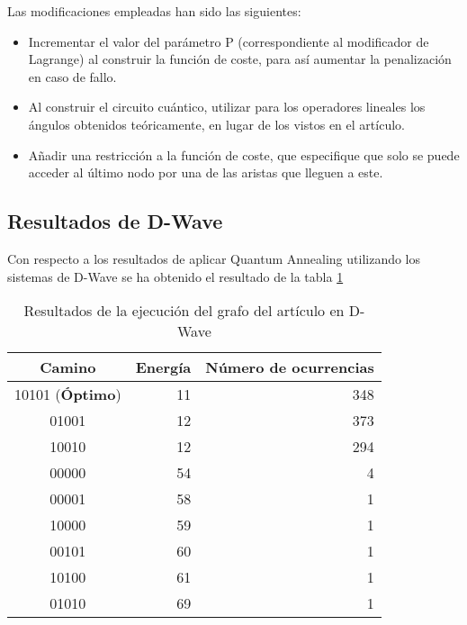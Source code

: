\documentclass{article}
\begin{document}
Las modificaciones empleadas han sido las siguientes:
\begin{itemize}
\item Incrementar el valor del parámetro P (correspondiente al modificador de Lagrange)
  al construir la función de coste, para así aumentar la penalización en caso de fallo.

\item Al construir el circuito cuántico, utilizar para los operadores lineales los ángulos obtenidos teóricamente, en lugar de los vistos en el artículo.

\item Añadir una restricción a la función de coste, que especifique que solo se puede acceder al último nodo por una de las aristas que lleguen a este.
\end{itemize}


\subsection{Resultados de D-Wave}
\label{sec:primer-resultados-dwave}
Con respecto a los resultados de aplicar Quantum Annealing utilizando los sistemas de D-Wave se ha obtenido el resultado de la tabla \ref{tab:primer_paper_dwave_estadisticas}

\begin{table}[htbp]
  \centering
  \begin{tabular}{|c|r|r|}
    \hline
    \textbf{Camino} & \textbf{Energía} & \textbf{Número de ocurrencias} \\ \hline
    10101 (\textbf{Óptimo}) & 11 & 348 \\ \hline
    01001 & 12 & 373 \\ \hline
    10010 & 12 & 294 \\ \hline
    00000 & 54 &   4 \\ \hline
    00001 & 58 &   1 \\ \hline
    10000 & 59 &   1 \\ \hline
    00101 & 60 &   1 \\ \hline
    10100 & 61 &   1 \\ \hline
    01010 & 69 &   1 \\ \hline
  \end{tabular}
  \caption{Resultados de la ejecución del grafo del artículo en D-Wave}
  \label{tab:primer_paper_dwave_estadisticas}
\end{table}
\end{document}
